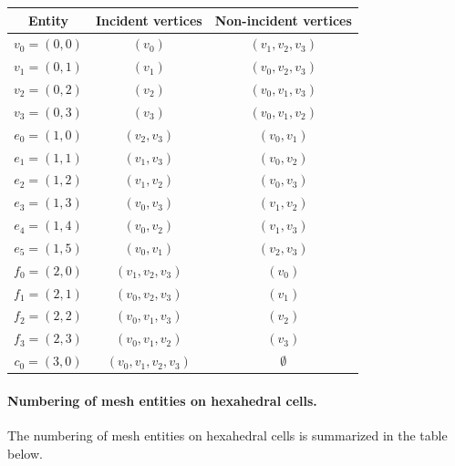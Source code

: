 \begin{center}
  \begin{tabular}{ccc}
    \toprule
    Entity & Incident vertices & Non-incident vertices \\
    \hline
    $v_0 = (0, 0)$ & $(v_0)$ & $(v_1, v_2, v_3)$ \\
    $v_1 = (0, 1)$ & $(v_1)$ & $(v_0, v_2, v_3)$ \\
    $v_2 = (0, 2)$ & $(v_2)$ & $(v_0, v_1, v_3)$ \\
    $v_3 = (0, 3)$ & $(v_3)$ & $(v_0, v_1, v_2)$ \\
    $e_0 = (1, 0)$ & $(v_2, v_3)$ & $(v_0, v_1)$ \\
    $e_1 = (1, 1)$ & $(v_1, v_3)$ & $(v_0, v_2)$ \\
    $e_2 = (1, 2)$ & $(v_1, v_2)$ & $(v_0, v_3)$ \\
    $e_3 = (1, 3)$ & $(v_0, v_3)$ & $(v_1, v_2)$ \\
    $e_4 = (1, 4)$ & $(v_0, v_2)$ & $(v_1, v_3)$ \\
    $e_5 = (1, 5)$ & $(v_0, v_1)$ & $(v_2, v_3)$ \\
    $f_0 = (2, 0)$ & $(v_1, v_2, v_3)$ & $(v_0)$ \\
    $f_1 = (2, 1)$ & $(v_0, v_2, v_3)$ & $(v_1)$ \\
    $f_2 = (2, 2)$ & $(v_0, v_1, v_3)$ & $(v_2)$ \\
    $f_3 = (2, 3)$ & $(v_0, v_1, v_2)$ & $(v_3)$ \\
    $c_0 = (3, 0)$ & $(v_0, v_1, v_2, v_3)$ & $\emptyset$ \\
    \bottomrule
  \end{tabular}
\end{center}

\paragraph{Numbering of mesh entities on hexahedral cells.}

The numbering of mesh entities on hexahedral cells is summarized in
the table below.

